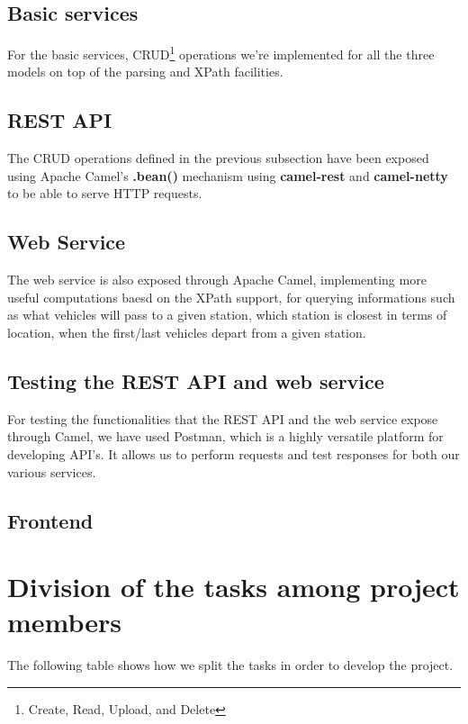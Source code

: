\subsection{Basic services}

For the basic services, CRUD\footnote{Create, Read, Upload, and Delete} operations we're implemented for all the three models on top of the parsing and XPath facilities.

\subsection{REST API}

The CRUD operations defined in the previous subsection have been exposed using Apache Camel's \textbf{.bean()} mechanism using \textbf{camel-rest} and \textbf{camel-netty} to be able to serve HTTP requests.

\subsection{Web Service}

The web service is also exposed through Apache Camel, implementing more useful computations baesd on the XPath support, for querying informations such as what vehicles will pass to a given station, which station is closest in terms of location, when the first/last vehicles depart from a given station.

\subsection{Testing the REST API and web service}

For testing the functionalities that the REST API and the web service expose through Camel, we have used Postman, which is a highly versatile platform for developing API's. It allows us to perform requests and test responses for both our various services.

\subsection{Frontend}


\section{Division of the tasks among project members}

The following table shows how we split the tasks in order to develop the project.

